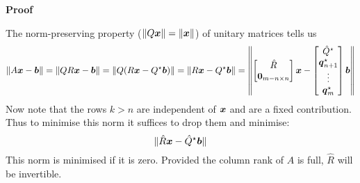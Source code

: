 \begin{example}[QR by hand]
\begin{theorem}
\end{theorem}
\textbf{Proof}

The norm-preserving property ($\|Q\bm{{\mbox{\boldmath$x$\unboldmath}}}\| = \|\bm{{\mbox{\boldmath$x$\unboldmath}}}\|$) of unitary matrices tells us
\[
\| A \bm{{\mbox{\boldmath$x$\unboldmath}}} - \bm{{\mbox{\boldmath$b$\unboldmath}}} \| = \| Q R \bm{{\mbox{\boldmath$x$\unboldmath}}} - \bm{{\mbox{\boldmath$b$\unboldmath}}} \| = \| Q (R \bm{{\mbox{\boldmath$x$\unboldmath}}} - Q^\star \bm{{\mbox{\boldmath$b$\unboldmath}}}) \| = \| R \bm{{\mbox{\boldmath$x$\unboldmath}}} - Q^\star \bm{{\mbox{\boldmath$b$\unboldmath}}} \| = \left \| 
\begin{bmatrix} \hat R \\ \bm{{\mbox{\boldmath$0$\unboldmath}}}_{m-n \times n} \end{bmatrix} \bm{{\mbox{\boldmath$x$\unboldmath}}} - \begin{bmatrix} \hat Q^\star \\ \bm{{\mbox{\boldmath$q$\unboldmath}}}_{n+1}^\star \\ \vdots \\ \bm{{\mbox{\boldmath$q$\unboldmath}}}_m^\star \end{bmatrix}     \bm{{\mbox{\boldmath$b$\unboldmath}}} \right \|
\]
Now note that the rows $k > n$ are independent of $\bm{{\mbox{\boldmath$x$\unboldmath}}}$ and are a fixed contribution. Thus to minimise this norm it suffices to drop them and minimise:
\[
\| \hat R \bm{{\mbox{\boldmath$x$\unboldmath}}} - \hat Q^\star \bm{{\mbox{\boldmath$b$\unboldmath}}} \|
\]
This norm is minimised if it is zero. Provided the column rank of $A$ is full, $\hat R$ will be invertible.

\end{example}



